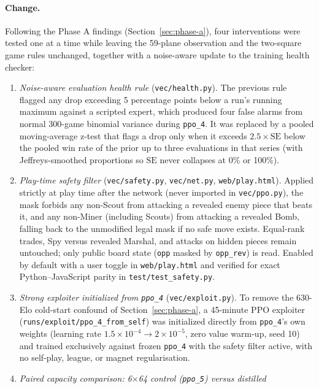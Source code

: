 \paragraph{Change.} Following the Phase A findings (Section~\ref{sec:phase-a}), four interventions
were tested one at a time while leaving the 59-plane observation and the two-square game rules
unchanged, together with a noise-aware update to the training health checker:
\begin{enumerate}
  \item \emph{Noise-aware evaluation health rule} (\texttt{vec/health.py}). The previous rule
        flagged any drop exceeding 5 percentage points below a run's running maximum against a
        scripted expert, which produced four false alarms from normal 300-game binomial variance
        during \texttt{ppo\_4}. It was replaced by a pooled moving-average z-test that flags a drop
        only when it exceeds $2.5 \times \mathrm{SE}$ below the pooled win rate of the prior up to
        three evaluations in that series (with Jeffreys-smoothed proportions so $\mathrm{SE}$ never
        collapses at 0\% or 100\%).
  \item \emph{Play-time safety filter} (\texttt{vec/safety.py}, \texttt{vec/net.py},
        \texttt{web/play.html}). Applied strictly at play time after the network (never imported in
        \texttt{vec/ppo.py}), the mask forbids any non-Scout from attacking a revealed enemy piece
        that beats it, and any non-Miner (including Scouts) from attacking a revealed Bomb, falling
        back to the unmodified legal mask if no safe move exists. Equal-rank trades, Spy versus
        revealed Marshal, and attacks on hidden pieces remain untouched; only public board state
        (\texttt{opp} masked by \texttt{opp\_rev}) is read. Enabled by default with a user toggle in
        \texttt{web/play.html} and verified for exact Python--JavaScript parity in
        \texttt{test/test\_safety.py}.
  \item \emph{Strong exploiter initialized from \texttt{ppo\_4}} (\texttt{vec/exploit.py}). To
        remove the 630-Elo cold-start confound of Section~\ref{sec:phase-a}, a 45-minute PPO
        exploiter (\texttt{runs/exploit/ppo\_4\_from\_self}) was initialized directly from
        \texttt{ppo\_4}'s own weights (learning rate $1.5 \times 10^{-4} \to 2 \times 10^{-5}$,
        zero value warm-up, seed 10) and trained exclusively against frozen \texttt{ppo\_4} with
        the safety filter active, with no self-play, league, or magnet regularisation.
  \item \emph{Paired capacity comparison: 6$\times$64 control (\texttt{ppo\_5}) versus distilled
}
\end{enumerate}
